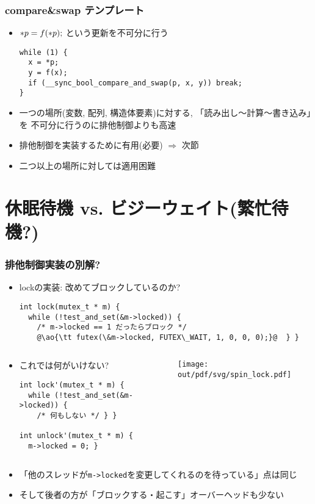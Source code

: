 \documentclass[12pt,dvipdfmx]{beamer}
\begin{document}
\begin{frame}[fragile]
  \frametitle{compare\&swap テンプレート}
\begin{itemize}
\item ${\tt *}p = f({\tt *}p);$ という更新を不可分に行う
\begin{lstlisting}
while (1) {
  x = *p;
  y = f(x);
  if (__sync_bool_compare_and_swap(p, x, y)) break;
}  
\end{lstlisting}
\item 一つの場所(変数, 配列, 構造体要素)に対する,
  「読み出し〜計算〜書き込み」を
  不可分に行うのに排他制御よりも高速
\item 排他制御を実装するために有用(必要) $\Rightarrow$ 次節
\item 二つ以上の場所に対しては適用困難
\end{itemize}
\end{frame}

\section{休眠待機 vs. ビジーウェイト(繁忙待機?)}
\begin{frame}[fragile]
  \frametitle{排他制御実装の別解?}
  \begin{itemize}
  \item lockの実装: 改めてブロックしているのか?
\begin{lstlisting}
int lock(mutex_t * m) {
  while (!test_and_set(&m->locked)) {
    /* m->locked == 1 だったらブロック */
    @\ao{\tt futex(\&m->locked, FUTEX\_WAIT, 1, 0, 0, 0);}@  } }
\end{lstlisting}
  \end{itemize}
  \begin{columns}
    \begin{column}{0.6\textwidth}
  \begin{itemize}
  \item これでは何がいけない?
\begin{lstlisting}
int lock'(mutex_t * m) {
  while (!test_and_set(&m->locked)) {
    /* 何もしない */ } }

int unlock'(mutex_t * m) {
  m->locked = 0; }
\end{lstlisting}
\end{itemize}      
\end{column}
\begin{column}{0.4\textwidth}
  \begin{center}
\texttt{[image: out/pdf/svg/spin\_lock.pdf]}
  \end{center}
\end{column}
\end{columns}
\begin{itemize}
\item 「他のスレッドが{\tt m->locked}を変更してくれるのを待っている」点は同じ
\item そして後者の方が「ブロックする・起こす」オーバーヘッドも少ない
  \end{itemize}
\end{frame}
\end{document}

